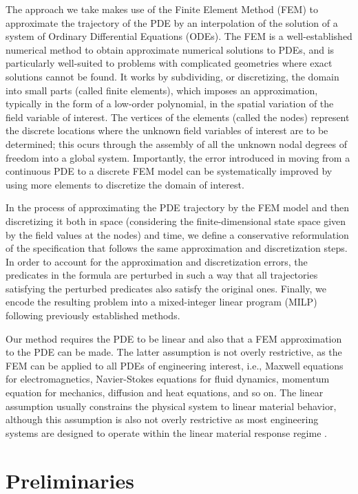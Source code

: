 \documentclass[oribibl]{llncs/llncs}
\begin{document}
The approach we take makes use of the Finite Element Method (FEM) to
approximate the trajectory of the PDE by an interpolation of the solution of a
system of Ordinary Differential Equations (ODEs). The FEM is a well-established
numerical method to obtain approximate numerical solutions to PDEs, and is particularly
well-suited to problems with complicated
geometries where exact solutions cannot be found. It works by subdividing, or
discretizing, the domain into small parts (called finite elements), which
imposes an approximation, typically in the form of a low-order polynomial, in
the spatial variation of the field variable of interest. The vertices of the
elements (called the nodes) represent the discrete locations where the unknown
field variables of interest are to be determined; this ocurs through the
assembly of all the unknown nodal degrees of freedom into a global system.
Importantly, the error introduced in moving from a continuous PDE to a discrete
FEM model can be systematically improved by using more elements to discretize
the domain of interest.

In the process of approximating the PDE trajectory by the FEM model and then
discretizing it both in space (considering the finite-dimensional state space
given by the field values at the nodes) and time, we define a conservative
reformulation of the specification that follows the same approximation and
discretization steps. In order to account for the approximation and
discretization errors, the predicates in the formula are perturbed in such a way
that all trajectories satisfying the perturbed predicates also satisfy the
original ones. Finally, we encode the resulting problem into a mixed-integer
linear program (MILP) following previously established methods.

Our method requires the PDE to be linear and also that a FEM approximation to
the PDE can be made. The
latter assumption is not overly restrictive, as the FEM can be applied to all PDEs 
of engineering interest, i.e., Maxwell equations for electromagnetics,
Navier-Stokes equations for fluid dynamics, momentum equation for mechanics,
diffusion and heat equations, and so on. The linear assumption usually constrains the
physical system to linear material behavior, although this assumption is also
not overly restrictive as most engineering systems are designed to operate
within the linear material response regime \cite{}.

\section{Preliminaries}
\label{sec:preliminaries}
\end{document}

